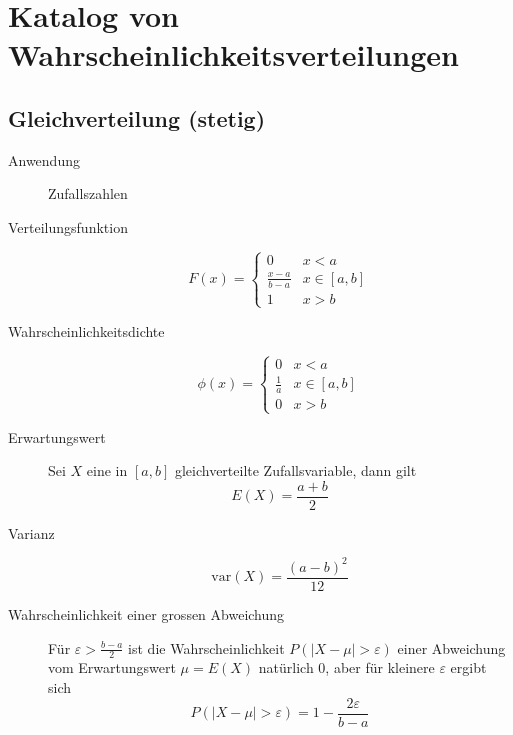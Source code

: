 \section{Katalog von Wahrscheinlichkeitsverteilungen}
\subsection{Gleichverteilung (stetig)}
\begin{description}
  \item[Anwendung] Zufallszahlen
  \item[Verteilungsfunktion] \[F(x) = \begin{cases} 0 & x < a \\
    \frac{x-a}{b-a} & x \in [a,b] \\ 1 & x > b\end{cases}\]
  \item[Wahrscheinlichkeitsdichte] \[\phi(x) = \begin{cases} 0 & x < a \\
    \frac{1}{a} & x \in [a,b] \\ 0 & x > b\end{cases}\]
  \item[Erwartungswert] Sei $X$ eine in $[a,b]$ gleichverteilte
    Zufallsvariable, dann gilt \[E(X) = \frac{a+b}{2}\]
  \item[Varianz] \[\text{var}(X) = \frac{(a-b)^2}{12}\]
  \item[Wahrscheinlichkeit einer grossen Abweichung] Für $\varepsilon >
  \frac{b-a}{2}$ ist die Wahrscheinlichkeit $P(|X-\mu| > \varepsilon)$
    einer Abweichung vom Erwartungswert $\mu = E(X)$ natürlich 0, aber für
    kleinere $\varepsilon$ ergibt sich
    \[P(|X-\mu| > \varepsilon) = 1 - \frac{2\varepsilon}{b-a}\]
\end{description}

